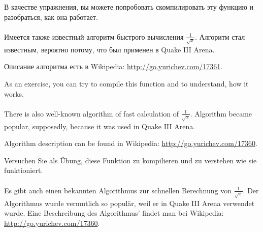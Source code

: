 \ifdefined\RUSSIAN
В качестве упражнения, вы можете попробовать скомпилировать эту функцию и разобраться, как она работает. \\
\\
Имеется также известный алгоритм быстрого вычисления $\frac{1}{\sqrt{x}}$.
Алгоритм стал известным, вероятно потому, что был применен в Quake III Arena.

Описание алгоритма есть в Wikipedia: \url{http://go.yurichev.com/17361}.
\fi %

\ifdefined\ENGLISH
As an exercise, you can try to compile this function and to understand, how it works. \\
\\
There is also well-known algorithm of fast calculation of $\frac{1}{\sqrt{x}}$.
Algorithm became popular, supposedly, because it was used in Quake III Arena.

Algorithm description can be found in Wikipedia: \url{http://go.yurichev.com/17360}.
\fi %

\ifdefined\GERMAN
Versuchen Sie als Übung, diese Funktion zu kompilieren und zu verstehen wie sie funktioniert.\\\\
Es gibt auch einen bekannten Algorithmus zur schnellen Berechnung von $\frac{1}{\sqrt{x}}$.
Der Algorithmus wurde vermutlich so populär, weil er in Quake III Arena verwendet wurde.
Eine Beschreibung des Algorithmus' findet man bei Wikipedia: \url{http://go.yurichev.com/17360}.
\fi %

